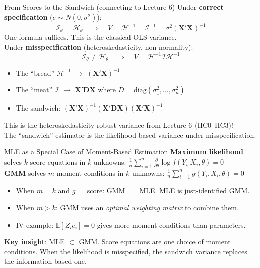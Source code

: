 \documentclass[aspectratio=169, handout, t]{beamer}
\numberwithin{equation}{section}
\begin{document}
\begin{frame}{From Scores to the Sandwich (connecting to Lecture 6)}
Under \textbf{correct specification} ($e\sim N(0,\sigma^2)$):
$$\mathcal{I}_\theta=\mathcal{H}_\theta \quad\Longrightarrow\quad V=\mathcal{H}^{-1}=\mathcal{I}^{-1}=\sigma^2(\bm{X'X})^{-1}$$
One formula suffices.  This is the classical OLS variance.\\\pause
\medskip
Under \textbf{misspecification} (heteroskedasticity, non-normality):
$$\mathcal{I}_\theta\neq\mathcal{H}_\theta \quad\Longrightarrow\quad V=\mathcal{H}^{-1}\mathcal{I}\mathcal{H}^{-1}$$\pause
\begin{itemize}
\item The ``bread'' $\mathcal{H}^{-1}$ $\to$ $(\bm{X'X})^{-1}$
\item The ``meat'' $\mathcal{I}$ $\to$ $\bm{X'DX}$ where $D=\text{diag}(\sigma_1^2,\ldots,\sigma_n^2)$
\item The sandwich: $(\bm{X'X})^{-1}(\bm{X'DX})(\bm{X'X})^{-1}$
\end{itemize}\pause
This is the \alert{heteroskedasticity-robust variance} from Lecture 6 (HC0--HC3)!\\
The ``sandwich'' estimator is the likelihood-based variance under misspecification.
\end{frame}

\begin{frame}{MLE as a Special Case of Moment-Based Estimation}
\textbf{Maximum likelihood} solves $k$ score equations in $k$ unknowns:
$\frac{1}{n}\sum_{i=1}^n \frac{\partial}{\partial \theta}\log f(Y_i|X_i,\theta)=0$\pause\\[4pt]
\textbf{GMM} solves $m$ moment conditions in $k$ unknowns:
$\frac{1}{n}\sum_{i=1}^n g(Y_i, X_i, \theta)=0$\pause
\begin{itemize}\setlength{\itemsep}{2pt}
\item When $m=k$ and $g=$ score: \alert{GMM $=$ MLE}.  MLE is just-identified GMM.\pause
\item When $m>k$: GMM uses an \emph{optimal weighting matrix} to combine them.
\item IV example: $\mathbb{E}[Z_i e_i]=0$ gives more moment conditions than parameters.\pause
\end{itemize}
\smallskip
\textbf{Key insight}: MLE $\subset$ GMM.  Score equations are one choice of moment conditions.  When the likelihood is misspecified, the sandwich variance replaces the information-based one.
\end{frame}
\end{document}
